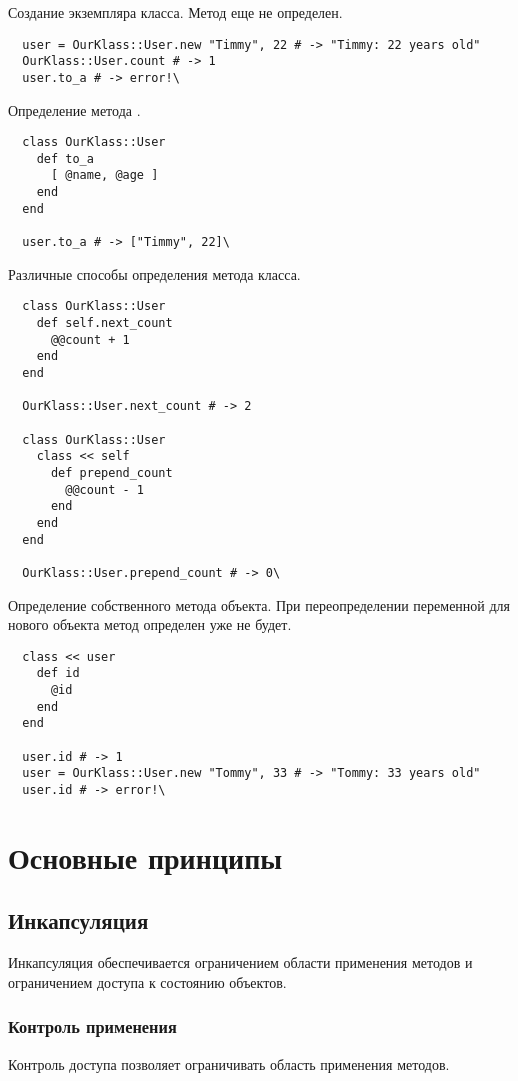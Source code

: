Создание экземпляра класса. Метод  еще не определен.
\begin{verbatim}
  user = OurKlass::User.new "Timmy", 22 # -> "Timmy: 22 years old"
  OurKlass::User.count # -> 1
  user.to_a # -> error!\
\end{verbatim}

Определение метода .
\begin{verbatim}
  class OurKlass::User
    def to_a
      [ @name, @age ]
    end
  end

  user.to_a # -> ["Timmy", 22]\
\end{verbatim}

Различные способы определения метода класса.
\begin{verbatim}
  class OurKlass::User
    def self.next_count
      @@count + 1
    end
  end

  OurKlass::User.next_count # -> 2

  class OurKlass::User
    class << self
      def prepend_count
        @@count - 1
      end
    end
  end

  OurKlass::User.prepend_count # -> 0\
\end{verbatim}

Определение собственного метода объекта. При переопределении переменной для нового объекта метод определен уже не будет.
\begin{verbatim}
  class << user
    def id
      @id
    end
  end

  user.id # -> 1
  user = OurKlass::User.new "Tommy", 33 # -> "Tommy: 33 years old"
  user.id # -> error!\
\end{verbatim}

\section{Основные принципы}

\subsection{Инкапсуляция}

Инкапсуляция обеспечивается ограничением области применения методов и ограничением доступа к состоянию объектов.

\subsubsection*{Контроль применения}

Контроль доступа позволяет ограничивать область применения методов.

